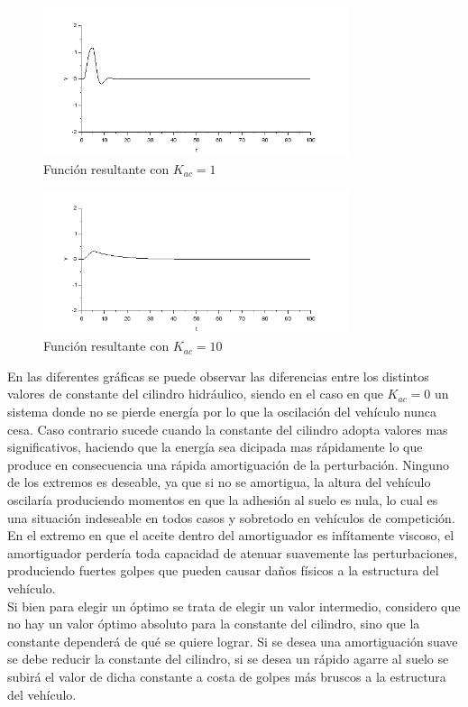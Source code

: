 \documentclass[12pt]{article}
\begin{document}
\begin{figure}[h!]
\center
\includegraphics[width=0.8\textwidth]{amortiguador_1.PNG}
\caption{Función resultante con $K_{ac}=1$}
\label{KAC1}
\end{figure}

\begin{figure}[h!]
\center
\includegraphics[width=0.8\textwidth]{amortiguador_10.PNG}
\caption{Función resultante con $K_{ac}=10$}
\label{KAC10}
\end{figure}

En las diferentes gráficas se puede observar las diferencias entre los distintos valores de constante del cilindro hidráulico, siendo en el caso en que $K_{ac} = 0$ un sistema donde no se pierde energía por lo que la oscilación del vehículo nunca cesa. Caso contrario sucede cuando la constante del cilindro adopta valores mas significativos, haciendo que la energía sea dicipada mas rápidamente lo que produce en consecuencia una rápida amortiguación de la perturbación. Ninguno de los extremos es deseable, ya que si no se amortigua, la altura del vehículo oscilaría produciendo momentos en que la adhesión al suelo es nula, lo cual es una situación indeseable en todos casos y sobretodo en vehículos de competición. En el extremo en que el aceite dentro del amortiguador es infítamente viscoso, el amortiguador perdería toda capacidad de atenuar suavemente las perturbaciones, produciendo fuertes golpes que pueden causar daños físicos a la estructura del vehículo.\\

Si bien para elegir un óptimo se trata de elegir un valor intermedio, considero que no hay un valor óptimo absoluto para la constante del cilindro, sino que la constante dependerá de qué se quiere lograr. Si se desea una amortiguación suave se debe reducir la constante del cilindro, si se desea un rápido agarre al suelo se subirá el valor de dicha constante a costa de golpes más bruscos a la estructura del vehículo.
\end{document}
